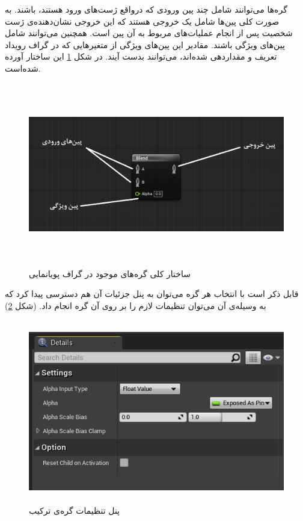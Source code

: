 گره‌‌ها می‌توانند شامل چند پین ورودی که درواقع ژست‌های ورود هستند، باشند.
به صورت کلی پین‌ها شامل یک خروجی هستند که این خروجی نشان‌دهنده‌ی 
ژست شخصیت پس از انجام عملیات‌های مربوط به آن پین است.
همچنین می‌توانند شامل پین‌های ویژگی باشند. مقادیر این پین‌های ویژگی از 
متغیر‌هایی که در گراف رویداد تعریف و مقداردهی شده‌اند، می‌توانند بدست آیند.
در شکل 
\ref{fig:AnimNodeStructure}
این ساختار آورده شده‌است.

\begin{figure}[ht]
	\centerline{\includegraphics[width=\textwidth,height=8cm,keepaspectratio]{Figures/Ch3/AnimNodeStructure.png}}

	\caption{ساختار کلی گره‌های موجود در گراف پویانمایی}
	\label{fig:AnimNodeStructure}
\end{figure}

قابل ذکر است با انتخاب هر گره می‌توان به پنل جزئیات آن هم دسترسی پیدا کرد 
که به وسیله‌ی‌ آن می‌توان تنظیمات لازم را بر روی آن گره انجام داد.
(شکل \ref{fig:AnimNodeDetailPanel})

\begin{figure}[ht]
	\centerline{\includegraphics[width=\textwidth,height=8cm,keepaspectratio]{Figures/Ch3/DetailsPanel.png}}

	\caption{پنل تنظیمات گره‌ی ترکیب}
	\label{fig:AnimNodeDetailPanel}
\end{figure}

